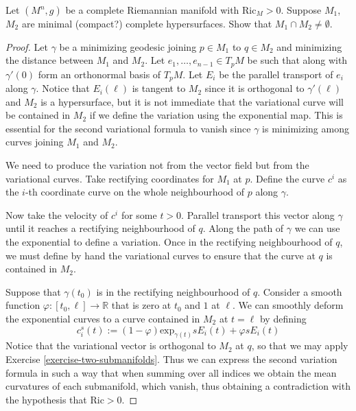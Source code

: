 \documentclass{book}
\begin{document}
\begin{exercise}
\label{exercise-inter-minim-hyper}
Let $(M^n,g)$ be a complete Riemannian
manifold with $\text{Ric}_M>0$.
Suppose $M_1$, $M_2$ are minimal (compact?)
complete hypersurfaces. Show that
$M_1 \cap M_2 \neq \emptyset$.
\end{exercise}

\begin{proof}
Let $\gamma$ be a minimizing geodesic joining
$p \in M_1$ to $q\in M_2$ and
minimizing the distance between $M_1$ and
$M_2$. Let $e_1,\ldots,e_{n-1}\in
T_pM$ be such that along with $\gamma'(0)$
form an orthonormal basis of $T_pM$.
Let $E_i$ be the parallel transport of $e_i$
along $\gamma$. Notice that
$E_i(\ell)$ is tangent to $M_2$ since it is
orthogonal to $\gamma'(\ell)$ and
$M_2$ is a hypersurface, but it is not
immediate that the variational curve will
be contained in $M_2$ if we define the
variation using the exponential map. This
is essential for the second variational
formula to vanish since $\gamma$ is
minimizing among curves joining $M_1$ and
$M_2$.

We need to produce the variation not from the
vector field but from the
variational curves. Take rectifying
coordinates for $M_1$ at $p$. Define the
curve $c^i$ as the $i$-th coordinate curve on
the whole neighbourhood of $p$
along $\gamma$.

Now take the velocity of $c^i$ for some
$t>0$. Parallel transport this vector
along $\gamma$ until it reaches a rectifying
neighbourhood of $q$. Along the
path of $\gamma$ we can use the exponential
to define a variation. Once in the
rectifying neighbourhood of $q$, we must
define by hand the variational curves
to ensure that the curve at $q$ is contained
in $M_2$.

Suppose that $\gamma(t_0)$ is in the
rectifying neighbourhood of $q$. Consider a
smooth function $\varphi:[t_0,\ell]\to
\mathbb{R}$ that is zero at $t_0$ and $1$
at $\ell$. We can smoothly deform the
exponential curves to a curve contained in
$M_2$ at $t=\ell$ by defining
$$
c^s_i(t):=(1-\varphi)\text{exp}_{\gamma(t)}
sE_i(t)+\varphi
sE_i(t)
$$
Notice that the variational vector is
orthogonal to $M_2$ at $q$, so that we may
apply Exercise
\ref{exercise-two-submanifolds}. Thus we can
express the second
variation formula in such a way that when
summing over all indices we obtain the
mean curvatures of each submanifold, which
vanish, thus obtaining a
contradiction with the hypothesis that
$\text{Ric}>0$.
\end{proof}
\end{document}
